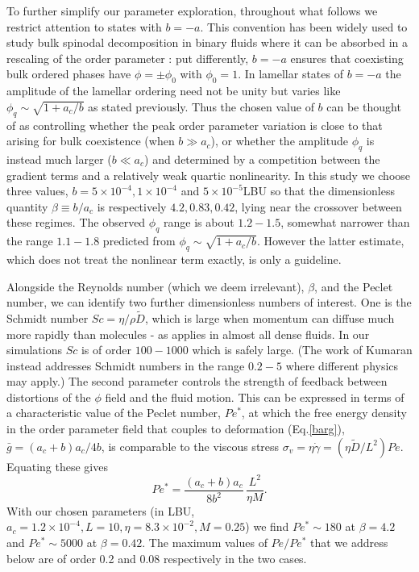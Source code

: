 \documentclass[8.5pt,twoside,twocolumn]{article}
\begin{document}
To further simplify our parameter exploration, throughout what follows we restrict attention to  states with $b = -a$. This convention has been widely used to study bulk spinodal decomposition in binary fluids where it can be absorbed in a rescaling of the order parameter \cite{Kendon01}: put differently, $b=-a$ ensures that coexisting bulk ordered phases have $\phi = \pm\phi_0$ with $\phi_0=1$. In lamellar states of $b= -a$ the amplitude of the lamellar ordering need not be unity but varies like $\phi_q \sim \sqrt{1+a_c/b}$ as stated previously. Thus the chosen value of $b$ can be thought of as controlling whether the peak order parameter variation is close to that arising for bulk coexistence (when $b\gg a_c$), or whether the amplitude $\phi_q$ is instead much larger ($b\ll a_c$) and determined by a competition between the gradient terms and a relatively weak quartic nonlinearity.  In this study we choose three values, $b = 5\times 10^{-4}, 1\times 10^{-4}$ and $5\times 10^{-5}$LBU so that the dimensionless quantity $\beta \equiv b/a_c$ is respectively $4.2,0.83,0.42$, lying near the crossover between these regimes. The observed $\phi_q$ range is about $1.2-1.5$, somewhat narrower than the range $1.1-1.8$ predicted from $\phi_q \sim \sqrt{1+a_c/b}$. However the latter estimate, which does not treat the nonlinear term exactly, is only a guideline.

Alongside the Reynolds number (which we deem irrelevant), $\beta$, and the Peclet number, we can identify two further dimensionless numbers of interest. One is the Schmidt number $Sc = \eta/\rho\tilde D$, which is large when momentum can diffuse much more rapidly than molecules - as applies in almost all dense fluids.  In our simulations $Sc$ is of order $100-1000$ which is safely large. (The work of Kumaran \cite{Kumaran2011} instead addresses Schmidt numbers in the range $0.2-5$ where different physics may apply.) The second parameter controls the strength of feedback between distortions of the $\phi$ field and the fluid motion. This 
can be expressed in terms of a characteristic value of the Peclet number, $Pe^*$, at which the free energy density in the order parameter field that couples to deformation (Eq.\ref{barg}), $\bar g=(a_c+b)a_c/4b$, is comparable to the viscous stress $\sigma_v=\eta\dot\gamma = (\eta \tilde D/L^2)Pe$. Equating these gives
\begin{equation}
Pe^* =\frac{(a_c+b)a_c}{8b^2}\,\frac{L^2}{\eta M}.
\label{pestar}
\end{equation}
With our chosen parameters (in LBU, $a_c=1.2\times 10^{-4}, L = 10, \eta = 8.3\times 10^{-2}, M = 0.25$) we find $Pe^* \sim 180$ at $\beta = 4.2$ and $Pe^* \sim 5000$ at $\beta = 0.42$. The maximum values of $Pe/Pe^*$ that we address below are of order 0.2 and 0.08 respectively in the two cases.
\end{document}
